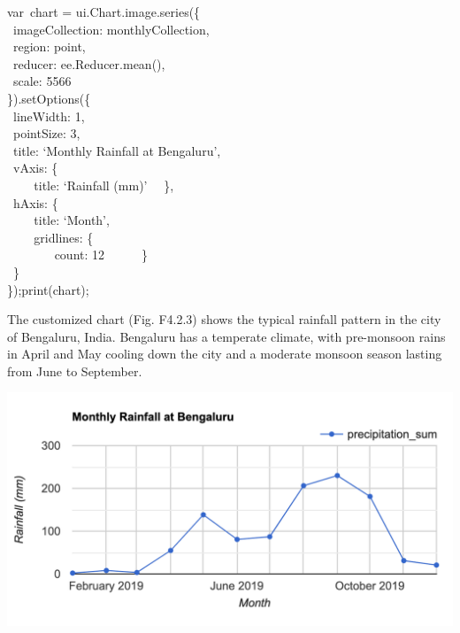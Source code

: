 \documentclass[
  letterpaper,
  DIV=11,
  numbers=noendperiod]{scrreprt}
\begin{document}
var~chart = ui.Chart.image.series(\{\\
\hspace*{0.333em} ~imageCollection: monthlyCollection,\\
\hspace*{0.333em} ~region: point,\\
\hspace*{0.333em} ~reducer: ee.Reducer.mean(),\\
\hspace*{0.333em} ~scale: 5566\\
\}).setOptions(\{\\
\hspace*{0.333em} ~lineWidth: 1,\\
\hspace*{0.333em} ~pointSize: 3,\\
\hspace*{0.333em} ~title: `Monthly Rainfall at Bengaluru',\\
\hspace*{0.333em} ~vAxis: \{\\
\hspace*{0.333em} ~ ~ ~title: `Rainfall (mm)'~ ~\},\\
\hspace*{0.333em} ~hAxis: \{\\
\hspace*{0.333em} ~ ~ ~title: `Month',\\
\hspace*{0.333em} ~ ~ ~gridlines: \{\\
\hspace*{0.333em} ~ ~ ~ ~ ~count: 12~ ~ ~ ~\}\\
\hspace*{0.333em} ~\}\\
\});print(chart);

The customized chart (Fig. F4.2.3) shows the typical rainfall pattern in
the city of Bengaluru, India. Bengaluru has a temperate climate, with
pre-monsoon rains in April and May cooling down the city and a moderate
monsoon season lasting from June to September.

\includegraphics{./F4/image32.png}
\end{document}
